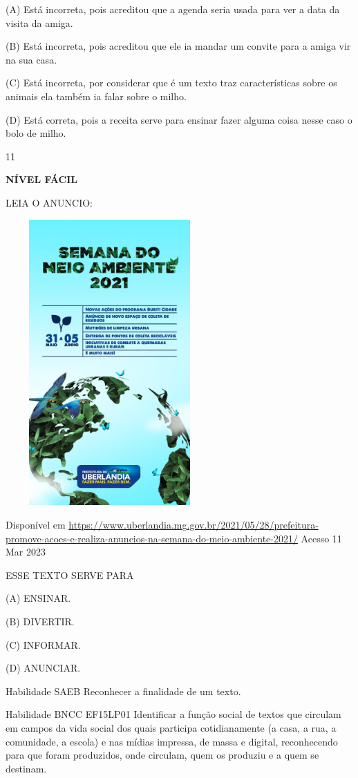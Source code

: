 {{(A) Está incorreta, pois acreditou que a agenda seria usada para ver a
data da visita da amiga.

(B) Está incorreta, pois acreditou que ele ia mandar um convite para a
amiga vir na sua casa.

(C) Está incorreta, por considerar que é um texto traz características
sobre os animais ela também ia falar sobre o milho.

(D) Está correta, pois a receita serve para ensinar fazer alguma coisa
nesse caso o bolo de milho.

\num{11}

\textbf{NÍVEL FÁCIL}

LEIA O ANUNCIO:

\includegraphics[width=3.12674in,height=4.31210in]{media/image145.jpeg}

Disponível em
\url{https://www.uberlandia.mg.gov.br/2021/05/28/prefeitura-promove-acoes-e-realiza-anuncios-na-semana-do-meio-ambiente-2021/}
Acesso 11 Mar 2023

ESSE TEXTO SERVE PARA

(A) ENSINAR.

(B) DIVERTIR.

(C) INFORMAR.

(D) ANUNCIAR.

Habilidade SAEB Reconhecer a finalidade de um texto.

Habilidade BNCC EF15LP01 Identificar a função social de textos que
circulam em campos da vida social dos quais participa cotidianamente (a
casa, a rua, a comunidade, a escola) e nas mídias impressa, de massa e
digital, reconhecendo para que foram produzidos, onde circulam, quem os
produziu e a quem se destinam.

}}
